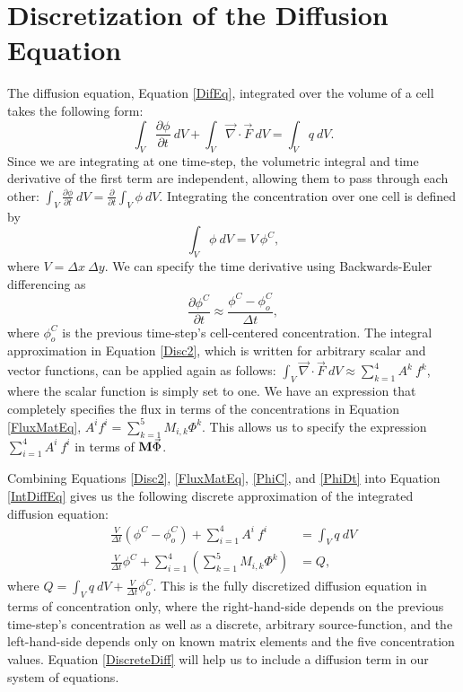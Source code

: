 \documentclass[11pt,letterpaper,oneside,notitlepage]{article}	%
\newcommand{\pd}[2]{\frac{\partial #1}{\partial #2}}	%
\newcommand{\del}{\vec\nabla}				%
\newcommand{\eq}[1]{Equation \eqref{#1}}		%
\newcommand{\pindent}[1]{\hspace{6mm}}  		%
\numberwithin{equation}{section}				%
\begin{document}
\section{Discretization of the Diffusion Equation}%
\pindent{}The diffusion equation, \eq{DifEq}, integrated over the volume of a cell takes the following form:
\begin{equation}
\int_V \pd{\phi}{t}\ dV+\int_V \del\cdot\vec F\ dV= \int_V q\ dV\label{IntDiffEq}.
\end{equation}
Since we are integrating at one time-step, the volumetric integral and time derivative of the first term are independent, allowing them to pass through each other: $\int_V \pd{\phi}{t}\ dV=\frac{\partial}{\partial t}\int_V \phi\ dV$.  Integrating the concentration over one cell is defined by
\begin{equation}
\int_V \phi\ dV=V\ \phi^C \label{PhiC},
\end{equation}
where $V=\Delta x\ \Delta y$.  We can specify the time derivative using Backwards-Euler differencing as
\begin{equation}
\pd{\phi^C}{t}\approx\frac{\phi^C-\phi^C_o}{\Delta t}\label{PhiDt},
\end{equation}
where $\phi_o^C$ is the previous time-step's cell-centered concentration.  The integral approximation in \eq{Disc2}, which is written for arbitrary scalar and vector functions, can be applied again as follows: $\int_V \vec\nabla\cdot\vec F\ dV \approx \sum^4_{k=1} A^k\ f^k$, where the scalar function is simply set to one.  We have an expression that completely specifies the flux in terms of the concentrations in \eq{FluxMatEq}, $A^i f^i = \sum_{k=1}^5 M_{i,k} \Phi^k$. This allows us to specify the expression $\sum_{i=1}^4 A^i\ f^i$ in terms of ${\bf M}\vec\Phi$.

Combining Equations \eqref{Disc2}, \eqref{FluxMatEq}, \eqref{PhiC}, and \eqref{PhiDt} into \eq{IntDiffEq} gives us the following discrete approximation of the integrated diffusion equation:
\begin{align}
\frac{V}{\Delta t}(\phi^C-\phi^C_o)+\sum_{i=1}^4 A^i\ f^i&=\int_V q\ dV \\
\frac{V}{\Delta t}\phi^C+\sum_{i=1}^4 \left( \sum_{k=1}^5 M_{i,k} \Phi^k \right)&=Q\label{DiscreteDiff}
,\end{align}
where $Q=\int_V q\ dV+\frac{V}{\Delta t}\phi^C_o$.  This is the fully discretized diffusion equation in terms of concentration only, where the right-hand-side depends on the previous time-step's concentration as well as a discrete, arbitrary source-function, and the left-hand-side depends only on known matrix elements and the five concentration values. \eq{DiscreteDiff} will help us to include a diffusion term in our system of equations.
\end{document}
